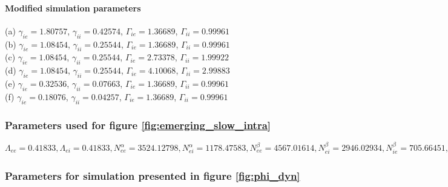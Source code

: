 \documentclass[a4paper,12pt]{article}
\begin{document}
\paragraph{Modified simulation parameters}
(a) $\gamma_{ie} = 1.80757$, $\gamma_{ii} = 0.42574$, $\Gamma_{ie} = 1.36689$, $\Gamma_{ii} = 0.99961$\\
(b) $\gamma_{ie} = 1.08454$, $\gamma_{ii} = 0.25544$, $\Gamma_{ie} = 1.36689$, $\Gamma_{ii} = 0.99961$\\
(c) $\gamma_{ie} = 1.08454$, $\gamma_{ii} = 0.25544$, $\Gamma_{ie} = 2.73378$, $\Gamma_{ii} = 1.99922$\\
(d) $\gamma_{ie} = 1.08454$, $\gamma_{ii} = 0.25544$, $\Gamma_{ie} = 4.10068$, $\Gamma_{ii} = 2.99883$\\
(e) $\gamma_{ie} = 0.32536$, $\gamma_{ii} = 0.07663$, $\Gamma_{ie} = 1.36689$, $\Gamma_{ii} = 0.99961$\\
(f) $\gamma_{ie} = 0.18076$, $\gamma_{ii} = 0.04257$, $\Gamma_{ie} = 1.36689$, $\Gamma_{ii} = 0.99961$\\

\subsubsection{Parameters used for figure \ref{fig:emerging_slow_intra}}
$\Lambda_{ee} = 0.41833, \Lambda_{ei} =  0.41833, N^{\alpha}_{ee} = 3524.12798, N^{\alpha}_{ei} = 1178.47583,
N^{\beta}_{ee} = 4567.01614, N^{\beta}_{ei} = 2946.02934, N^{\beta}_{ie} = 705.66451, N^{\beta}_{ii} = 155.69243,
\hat{\Gamma}_{ee} = 1.03021, \hat{\Gamma}_{ei} = 1.24548, \Gamma_{ie} = 3.32228, \Gamma_{ii} = 2.28976,
\chi_{ee} = 1290.08, \chi_{ei} = 1290.08, \gamma_{ee} = 0.71337, \gamma_{ei} = 0.53411,
\gamma_{ie} = 0.35526, \gamma_{ii} = 0.02911, h_e^{rest} = -79.27218, h_{ee}^{eq} = -19.32193,
h_{ei}^{eq} = -8.30757, h_i^{rest} = -76.08372, h_{ie}^{eq} = -85.45751, h_{ii}^{eq} = -84.48223,
\mu_e: -54.37736, \mu_i: -54.60727, p_{ee}: 6.83303, p_{ei}: 9.26794, p_{ie}: 0.0, p_{ii}: 0.0,
\phi_{ie}: 0, phi_{ii}: 0, S_e^{max} = 0.0637, S_i^{max} = 0.08382, \sigma_e = 4.16944,
\sigma_i = 2.1261, \tau_e = 73.3, \tau_i = 75.2, \tau^{slow}_{ee} = 1612.6,
  \tau^{slow}_{ei}: 1612.6, v_{ee} = 0.83906, v_{ei} = 0.83906$

\subsubsection{Parameters for simulation presented in figure \ref{fig:phi_dyn}}
\end{document}

